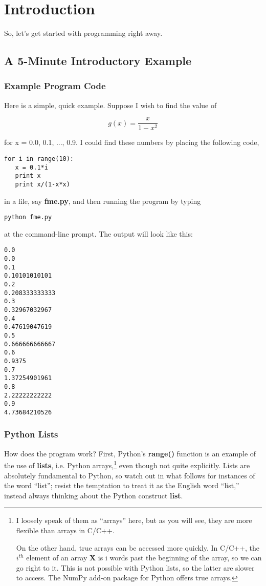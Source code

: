 \chapter{Introduction} 
\label{chap:intro}

So, let's get started with programming right away.

\section{A 5-Minute Introductory Example}

\subsection{Example Program Code}
\label{veryfirst}

Here is a simple, quick example.  Suppose I wish to find the value of 

$$
g(x) = \frac{x}{1-x^2}
$$

for x = 0.0, 0.1, ..., 0.9.  I could find these numbers by placing the
following code,

\begin{samepage}
\begin{Verbatim}[fontsize=\relsize{-2}]
for i in range(10):
   x = 0.1*i
   print x
   print x/(1-x*x)
\end{Verbatim}
\end{samepage}

in a file, say {\bf fme.py},
and then running the program by
typing

\begin{Verbatim}[fontsize=\relsize{-2}]
python fme.py
\end{Verbatim}

at the command-line prompt.  The output will look
like this:

\begin{Verbatim}[fontsize=\relsize{-2}]
0.0
0.0
0.1
0.10101010101
0.2
0.208333333333
0.3
0.32967032967
0.4
0.47619047619
0.5
0.666666666667
0.6
0.9375
0.7
1.37254901961
0.8
2.22222222222
0.9
4.73684210526
\end{Verbatim}

\subsection{Python Lists}

How does the program work?  First, Python's {\bf range()} function is an
example of the use of {\bf lists}, i.e. Python arrays,\footnote{I
loosely speak of them as ``arrays'' here, but as you will see, they are
more flexible than arrays in C/C++.  

On the other hand, true arrays can be accessed more quickly.  In C/C++,
the $i^{th}$ element of an array {\bf X} is i words past the beginning
of the array, so we can go right to it.  This is not possible with
Python lists, so the latter are slower to access.  The NumPy add-on
package for Python offers true arrays.} even though not quite
explicitly.  Lists are absolutely fundamental to Python, so watch out in
what follows for instances of the word ``list''; resist the temptation
to treat it as the English word ``list,'' instead always thinking about
the Python construct {\bf list}.

